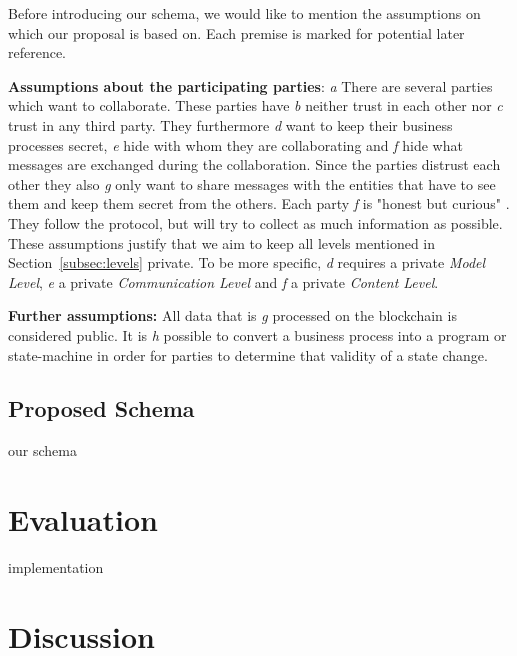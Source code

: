 \documentclass[runningheads]{llncs}
\newcommand{\ber}[1]{\textit{#1}}
\newcommand{\refsec}[1]{Section~\ref{#1}}
\begin{document}
Before introducing our schema, we would like to mention the assumptions on which our proposal is based on. Each premise is marked for potential later reference. 



\bigbreak
\textbf{Assumptions about the participating parties}: \ber{a} There are several parties which want to collaborate. These parties have \ber{b} neither trust in each other nor \ber{c} trust in any third party. They furthermore \ber{d} want to keep their business processes secret, \ber{e} hide with whom they are collaborating and \ber{f} hide what messages are exchanged during the collaboration. Since the parties distrust each other they also \ber{g} only want to share messages with the entities that have to see them and keep them secret from the others. Each party \ber{f} is "honest but curious" . They follow the protocol, but will try to collect as much information as possible. These assumptions justify that we aim to keep all levels mentioned in \refsec{subsec:levels}  private. To be more specific, \ber{d} requires a private \ber{Model Level}, \ber{e} a private \ber{Communication Level} and \ber{f} a private  \ber{Content Level}.


\bigbreak
\textbf{Further assumptions:}
All data that is \ber{g} processed on the blockchain is considered public. It is \ber{h} possible to convert a business process into a program or state-machine in order for parties to determine that validity of a state change.




\subsection{Proposed Schema} \label{subsec:schema}

our schema


\section{Evaluation} \label{sec:eval}

implementation


\section{Discussion} \label{sec:discussion}
\end{document}
